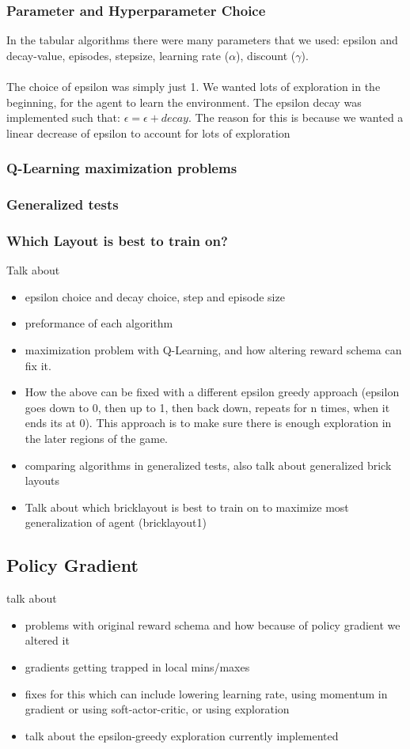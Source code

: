 \documentclass[twoside,11pt]{article}
\begin{document}
\subsubsection{Parameter and Hyperparameter Choice}
In the tabular algorithms there were many parameters that we used: epsilon and decay-value, episodes, stepsize, learning rate ($\alpha$),  discount ($\gamma$).
\\\\
The choice of epsilon was simply just 1. We wanted lots of exploration in the beginning, for the agent to learn the environment. The epsilon decay was implemented such that: $\epsilon = \epsilon + decay$. The reason for this is because we wanted a linear decrease of epsilon to account for lots of exploration
\subsubsection{Q-Learning maximization problems}
\subsubsection{Generalized tests}
\subsubsection{Which Layout is best to train on?}
Talk about
\begin{itemize}
\item epsilon choice and decay choice, step and episode size
\item preformance of each algorithm
\item maximization problem with Q-Learning, and how altering reward schema can fix it.
\item How the above can be fixed with a different epsilon greedy approach (epsilon goes down to 0, then up to 1, then back down, repeats for n times, when it ends its at 0). This approach is to make sure there is enough exploration in the later regions of the game.
\item comparing algorithms in generalized tests, also talk about generalized brick layouts
\item Talk about which bricklayout is best to train on to maximize most generalization of agent (bricklayout1)
\end{itemize}

\subsection{Policy Gradient}
talk about
\begin{itemize}
\item problems with original reward schema and how because of policy gradient we altered it
\item gradients getting trapped in local mins/maxes
\item fixes for this which can include lowering learning rate, using momentum in gradient or using soft-actor-critic, or using exploration
\item talk about the epsilon-greedy exploration currently implemented
\end{itemize}



\end{document}

